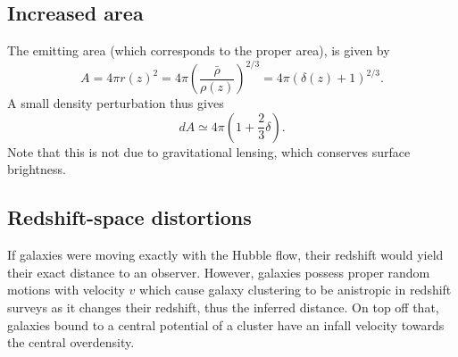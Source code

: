 \documentclass[twocolumns]{emulateapj}
\begin{document}





\subsection{Increased area}

 The emitting area (which corresponds to the proper area), is given by
  \begin{equation}
    \label{eq:emitting_area}
A=4\pi r(z)^2=4\pi\left(\frac{\bar{\rho}}{\rho(z)}\right)^{2/3}=4\pi(\delta(z)+1)^{2/3}.
  \end{equation}
A small density perturbation thus gives
\begin{equation}
  \label{eq:pert_area}
dA\simeq 4\pi \left(1+\frac{2}{3}\delta\right).
\end{equation}
Note that this is not due to gravitational lensing, which conserves  surface brightness.


\subsection{Redshift-space distortions}
If galaxies were moving exactly with the Hubble flow, their redshift would yield their exact distance to an observer. However, galaxies possess proper random motions with velocity $v$ which cause galaxy clustering to be anistropic in redshift surveys as it changes their redshift, thus the inferred distance. On top off that, galaxies bound to a central potential of a cluster have an infall velocity towards the central overdensity.


\end{document}
